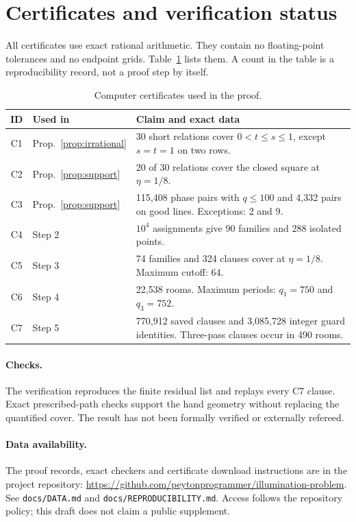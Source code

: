 \documentclass[11pt]{article}
\theoremstyle{remark}
\begin{document}
\section{Certificates and verification status}\label{sec:status}
All certificates use exact rational arithmetic. They contain no floating-point tolerances and no endpoint grids. Table~\ref{tab:certs} lists them. A count in the table is a reproducibility record, not a proof step by itself.

\begin{table}[ht]
\centering
\small
\begin{tabular}{clp{7.1cm}}
\hline
ID & Used in & Claim and exact data\\
\hline
C1 & Prop.~\ref{prop:irrational} & 30 short relations cover $0<t\le s\le1$, except $s=t=1$ on two rows.\\
C2 & Prop.~\ref{prop:support} & 20 of 30 relations cover the closed square at $\eta=1/8$.\\
C3 & Prop.~\ref{prop:support} & 115{,}408 phase pairs with $q\le100$ and 4{,}332 pairs on good lines. Exceptions: 2 and 9.\\
C4 & Step 2 & $10^4$ assignments give 90 families and 288 isolated points.\\
C5 & Step 3 & 74 families and 324 clauses cover at $\eta=1/8$. Maximum cutoff: 64.\\
C6 & Step 4 & 22{,}538 rooms. Maximum periods: $q_1=750$ and $q_3=752$.\\
C7 & Step 5 & 770{,}912 saved clauses and 3{,}085{,}728 integer guard identities. Three-pass clauses occur in 490 rooms.\\
\hline
\end{tabular}
\caption{Computer certificates used in the proof.}
\label{tab:certs}
\end{table}

\paragraph{Checks.} The verification reproduces the finite residual list and replays every C7 clause. Exact prescribed-path checks support the hand geometry without replacing the quantified cover. The result has not been formally verified or externally refereed.

\paragraph{Data availability.} The proof records, exact checkers and certificate download instructions are in the project repository: \url{https://github.com/peytonprogrammer/illumination-problem}. See \texttt{docs/DATA.md} and \texttt{docs/REPRODUCIBILITY.md}. Access follows the repository policy; this draft does not claim a public supplement.
\end{document}
